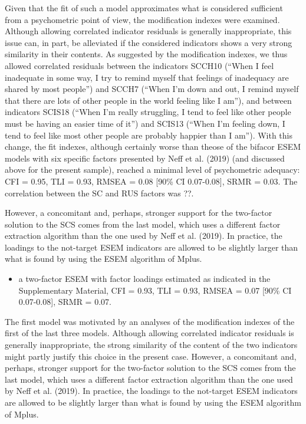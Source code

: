 \documentclass[
  english,
  man,floatsintext]{apa7}
\providecommand{\tightlist}{%
  \setlength{\itemsep}{0pt}\setlength{\parskip}{0pt}}
\begin{document}
Given that the fit of such a model approximates what is considered sufficient from a psychometric point of view, the modification indexes were examined.
Although allowing correlated indicator residuals is generally inappropriate, this issue can, in part, be alleviated if the considered indicators shows a very strong similarity in their contents.
As suggested by the modification indexes, we thus allowed correlated residuals between the indicators SCCH10 (``When I feel inadequate in some way, I try to remind myself that feelings of inadequacy are shared by most people'') and SCCH7 (``When I'm down and out, I remind myself that there are lots of other people in the world feeling like I am''), and between indicators SCIS18 (``When I'm really struggling, I tend to feel like other people must be having an easier time of it'') and SCIS13 (``When I'm feeling down, I tend to feel like most other people are probably happier than I am''). With this change, the fit indexes, although certainly worse than theose of the bifacor ESEM models with six specific factors presented by Neff et al. (2019) (and discussed above for the present sample), reached a minimal level of psychometric adequacy: CFI = 0.95, TLI = 0.93, RMSEA = 0.08 {[}90\% CI 0.07-0.08{]}, SRMR = 0.03.
The correlation between the SC and RUS factors was ??.

However, a concomitant and, perhaps, stronger support for the two-factor solution to the SCS comes from the last model, which uses a different factor extraction algorithm than the one used by Neff et al. (2019).
In practice, the loadings to the not-target ESEM indicators are allowed to be slightly larger than what is found by using the ESEM algorithm of Mplus.

\begin{itemize}
\tightlist
\item
  a two-factor ESEM with factor loadings estimated as indicated in the Supplementary Material, CFI = 0.93, TLI = 0.93, RMSEA = 0.07 {[}90\% CI 0.07-0.08{]}, SRMR = 0.07.
\end{itemize}

The first model was motivated by an analyses of the modification indexes of the first of the last three models.
Although allowing correlated indicator residuals is generally inappropriate, the strong similarity of the content of the two indicators might partly justify this choice in the present case.
However, a concomitant and, perhaps, stronger support for the two-factor solution to the SCS comes from the last model, which uses a different factor extraction algorithm than the one used by Neff et al. (2019).
In practice, the loadings to the not-target ESEM indicators are allowed to be slightly larger than what is found by using the ESEM algorithm of Mplus.
\end{document}
